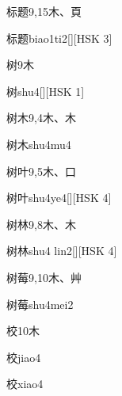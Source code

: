 \begin{entry}{标题}{9,15}{⽊、⾴}
  \begin{phonetics}{标题}{biao1ti2}[][HSK 3]
  \end{phonetics}
\end{entry}

\begin{entry}{树}{9}{⽊}
  \begin{phonetics}{树}{shu4}[][HSK 1]
  \end{phonetics}
\end{entry}

\begin{entry}{树木}{9,4}{⽊、⽊}
  \begin{phonetics}{树木}{shu4mu4}
  \end{phonetics}
\end{entry}

\begin{entry}{树叶}{9,5}{⽊、⼝}
  \begin{phonetics}{树叶}{shu4ye4}[][HSK 4]
  \end{phonetics}
\end{entry}

\begin{entry}{树林}{9,8}{⽊、⽊}
  \begin{phonetics}{树林}{shu4 lin2}[][HSK 4]
  \end{phonetics}
\end{entry}

\begin{entry}{树莓}{9,10}{⽊、⾋}
  \begin{phonetics}{树莓}{shu4mei2}
  \end{phonetics}
\end{entry}

\begin{entry}{校}{10}{⽊}
  \begin{phonetics}{校}{jiao4}
  \end{phonetics}
  \begin{phonetics}{校}{xiao4}
  \end{phonetics}
\end{entry}

